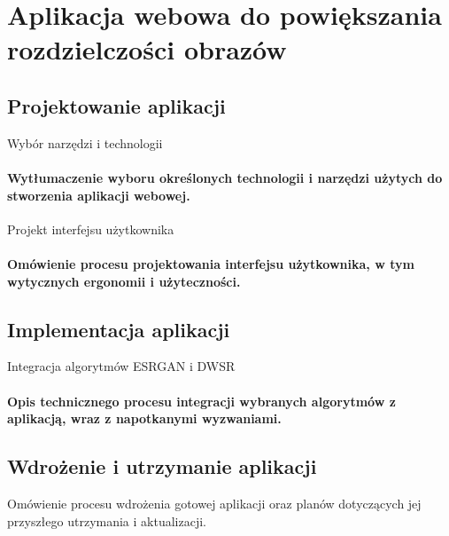 \chapter{Aplikacja webowa do powiększania rozdzielczości obrazów}
\section{Projektowanie aplikacji}
Wybór narzędzi i technologii
\subsubsection{Wytłumaczenie wyboru określonych technologii i narzędzi użytych do stworzenia aplikacji webowej.}
Projekt interfejsu użytkownika
\subsubsection{Omówienie procesu projektowania interfejsu użytkownika, w tym wytycznych ergonomii i użyteczności.}
\section{Implementacja aplikacji}
Integracja algorytmów ESRGAN i DWSR
\subsubsection{Opis technicznego procesu integracji wybranych algorytmów z aplikacją, wraz z napotkanymi wyzwaniami.}
\section{Wdrożenie i utrzymanie aplikacji}
Omówienie procesu wdrożenia gotowej aplikacji oraz planów dotyczących jej przyszłego utrzymania i aktualizacji.
